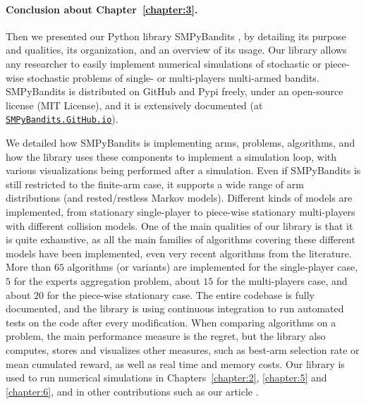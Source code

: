 \paragraph{Conclusion about \textbf{Chapter~\ref{chapter:3}}.}

Then we presented our Python library SMPyBandits \cite{SMPyBanditsJMLR,SMPyBandits}, by detailing
its purpose and qualities, its organization, and an overview of its usage.
%
Our library allows any researcher to easily implement numerical simulations of stochastic or piece-wise stochastic problems of single- or multi-players multi-armed bandits.
SMPyBandits is distributed on GitHub and Pypi freely, under an open-source license (MIT License), and it is extensively documented (at \href{https://SMPyBandits.GitHub.io}{\texttt{SMPyBandits.GitHub.io}}).

We detailed how SMPyBandits is implementing arms, problems, algorithms, and how the library uses these components to implement a simulation loop, with various visualizations being performed after a simulation.
Even if SMPyBandits is still restricted to the finite-arm case, it supports a wide range of arm distributions (and rested/restless Markov models).
Different kinds of models are implemented, from stationary single-player to piece-wise stationary multi-players with different collision models.
One of the main qualities of our library is that it is quite exhaustive, as all the main families of algorithms covering these different models have been implemented, even very recent algorithms from the literature.
More than $65$ algorithms (or variants) are implemented for the single-player case, $5$ for the experts aggregation problem, about $15$ for the multi-players case, and about $20$ for the piece-wise stationary case.
The entire codebase is fully documented, and the library is using continuous integration to run automated tests on the code after every modification.
%
When comparing algorithms on a problem, the main performance measure is the regret, but the library also computes, stores and visualizes other measures, such as best-arm selection rate or mean cumulated reward, as well as real time and memory costs.
%
Our library is used to run numerical simulations in Chapters~\ref{chapter:2}, \ref{chapter:5} and \ref{chapter:6}, and in other contributions such as our article \cite{Besson2018DoublingTricks}.


